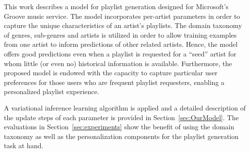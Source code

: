This work describes a model for playlist generation designed for Microsoft's Groove music service. The model incorporates per-artist parameters in order to capture the unique characteristics of an artist's playlists. The domain taxonomy of genres, sub-genres and artists is utilized in order to allow training examples from one artist to inform predictions of other related artists. Hence, the model offers good predictions even when a playlist is requested for a ``seed'' artist for whom little (or even no) historical information is available. Furthermore, the proposed model is endowed with the capacity to capture particular user preferences for those users who are frequent playlist requesters, enabling a personalized playlist experience. %

A variational inference learning algorithm is applied and a detailed description of the update steps of each parameter is provided in Section~\ref{sec:OurModel}. %
The evaluations in Section~\ref{sec:experiments} show the benefit of using the domain taxonomy as well as the personalization components for the playlist generation task at hand.%

